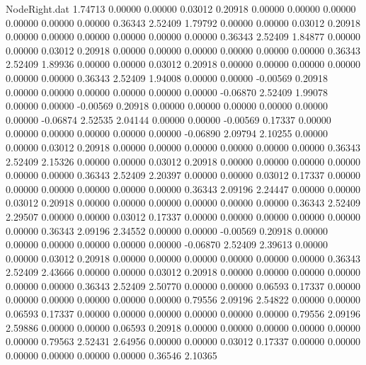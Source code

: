 \begin{filecontents}{NodeRight.dat}
   1.74713    0.00000    0.00000     0.03012    0.20918    0.00000    0.00000    0.00000    0.00000    0.00000    0.00000    0.36343    2.52409
   1.79792    0.00000    0.00000     0.03012    0.20918    0.00000    0.00000    0.00000    0.00000    0.00000    0.00000    0.36343    2.52409
   1.84877    0.00000    0.00000     0.03012    0.20918    0.00000    0.00000    0.00000    0.00000    0.00000    0.00000    0.36343    2.52409
   1.89936    0.00000    0.00000     0.03012    0.20918    0.00000    0.00000    0.00000    0.00000    0.00000    0.00000    0.36343    2.52409
   1.94008    0.00000    0.00000    -0.00569    0.20918    0.00000    0.00000    0.00000    0.00000    0.00000    0.00000   -0.06870    2.52409
   1.99078    0.00000    0.00000    -0.00569    0.20918    0.00000    0.00000    0.00000    0.00000    0.00000    0.00000   -0.06874    2.52535
   2.04144    0.00000    0.00000    -0.00569    0.17337    0.00000    0.00000    0.00000    0.00000    0.00000    0.00000   -0.06890    2.09794
   2.10255    0.00000    0.00000     0.03012    0.20918    0.00000    0.00000    0.00000    0.00000    0.00000    0.00000    0.36343    2.52409
   2.15326    0.00000    0.00000     0.03012    0.20918    0.00000    0.00000    0.00000    0.00000    0.00000    0.00000    0.36343    2.52409
   2.20397    0.00000    0.00000     0.03012    0.17337    0.00000    0.00000    0.00000    0.00000    0.00000    0.00000    0.36343    2.09196
   2.24447    0.00000    0.00000     0.03012    0.20918    0.00000    0.00000    0.00000    0.00000    0.00000    0.00000    0.36343    2.52409
   2.29507    0.00000    0.00000     0.03012    0.17337    0.00000    0.00000    0.00000    0.00000    0.00000    0.00000    0.36343    2.09196
   2.34552    0.00000    0.00000    -0.00569    0.20918    0.00000    0.00000    0.00000    0.00000    0.00000    0.00000   -0.06870    2.52409
   2.39613    0.00000    0.00000     0.03012    0.20918    0.00000    0.00000    0.00000    0.00000    0.00000    0.00000    0.36343    2.52409
   2.43666    0.00000    0.00000     0.03012    0.20918    0.00000    0.00000    0.00000    0.00000    0.00000    0.00000    0.36343    2.52409
   2.50770    0.00000    0.00000     0.06593    0.17337    0.00000    0.00000    0.00000    0.00000    0.00000    0.00000    0.79556    2.09196
   2.54822    0.00000    0.00000     0.06593    0.17337    0.00000    0.00000    0.00000    0.00000    0.00000    0.00000    0.79556    2.09196
   2.59886    0.00000    0.00000     0.06593    0.20918    0.00000    0.00000    0.00000    0.00000    0.00000    0.00000    0.79563    2.52431
   2.64956    0.00000    0.00000     0.03012    0.17337    0.00000    0.00000    0.00000    0.00000    0.00000    0.00000    0.36546    2.10365

\end{filecontents}
